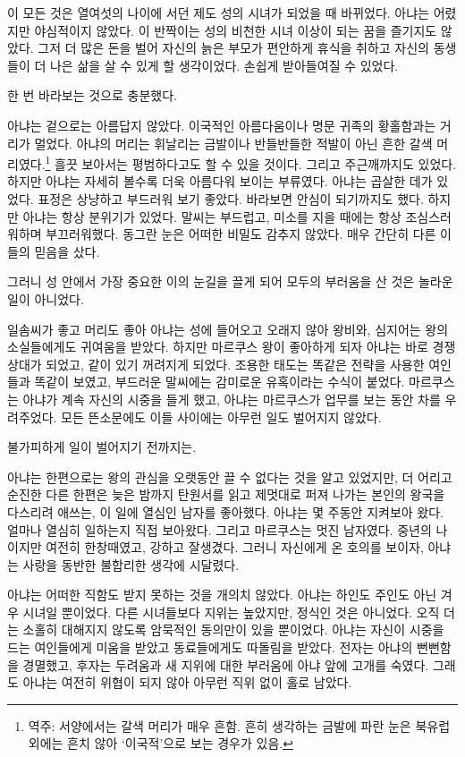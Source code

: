 이 모든 것은 열여섯의 나이에 서던 제도 성의 시녀가 되었을 때 바뀌었다. 아냐는 어렸지만 야심적이지 않았다. 이 반짝이는 성의 비천한 시녀 이상이 되는 꿈을 즐기지도 않았다. 그저 더 많은 돈을 벌어 자신의 늙은 부모가 편안하게 휴식을 취하고 자신의 동생들이 더 나은 삶을 살 수 있게 할 생각이었다. 손쉽게 받아들여질 수 있었다.

한 번 바라보는 것으로 충분했다.

아냐는 겉으로는 아름답지 않았다. 이국적인 아름다움이나 명문 귀족의 황홀함과는 거리가 멀었다. 아냐의 머리는 휘날리는 금발이나 반들반들한 적발이 아닌 흔한 갈색 머리였다.\footnote{역주: 서양에서는 갈색 머리가 매우 흔함. 흔히 생각하는 금발에 파란 눈은 북유럽 외에는 흔치 않아 `이국적'으로 보는 경우가 있음.} 흘끗 보아서는 평범하다고도 할 수 있을 것이다. 그리고 주근깨까지도 있었다. 하지만 아냐는 자세히 볼수록 더욱 아름다워 보이는 부류였다. 아냐는 곱살한 데가 있었다. 표정은 상냥하고 부드러워 보기 좋았다. 바라보면 안심이 되기까지도 했다. 하지만 아냐는 항상 분위기가 있었다. 말씨는 부드럽고, 미소를 지을 때에는 항상 조심스러워하며 부끄러워했다. 동그란 눈은 어떠한 비밀도 감추지 않았다. 매우 간단히 다른 이들의 믿음을 샀다.

그러니 성 안에서 가장 중요한 이의 눈길을 끌게 되어 모두의 부러움을 산 것은 놀라운 일이 아니었다.

일솜씨가 좋고 머리도 좋아 아냐는 성에 들어오고 오래지 않아 왕비와, 심지어는 왕의 소실들에게도 귀여움을 받았다. 하지만 마르쿠스 왕이 좋아하게 되자 아냐는 바로 경쟁 상대가 되었고, 같이 있기 꺼려지게 되었다. 조용한 태도는 똑같은 전략을 사용한 여인들과 똑같이 보였고, 부드러운 말씨에는 감미로운 유혹이라는 수식이 붙었다. 마르쿠스는 아냐가 계속 자신의 시중을 들게 했고, 아냐는 마르쿠스가 업무를 보는 동안 차를 우려주었다. 모든 뜬소문에도 이들 사이에는 아무런 일도 벌어지지 않았다.

불가피하게 일이 벌어지기 전까지는.

아냐는 한편으로는 왕의 관심을 오랫동안 끌 수 없다는 것을 알고 있었지만, 더 어리고 순진한 다른 한편은 늦은 밤까지 탄원서를 읽고 제멋대로 퍼져 나가는 본인의 왕국을 다스리려 애쓰는, 이 일에 열심인 남자를 좋아했다. 아냐는 몇 주동안 지켜보아 왔다. 얼마나 열심히 일하는지 직접 보아왔다. 그리고 마르쿠스는 멋진 남자였다. 중년의 나이지만 여전히 한창때였고, 강하고 잘생겼다. 그러니 자신에게 온 호의를 보이자, 아냐는 사랑을 동반한 불합리한 생각에 시달렸다.

아냐는 어떠한 직함도 받지 못하는 것을 개의치 않았다. 아냐는 하인도 주인도 아닌 겨우 시녀일 뿐이었다. 다른 시녀들보다 지위는 높았지만, 정식인 것은 아니었다. 오직 더는 소홀히 대해지지 않도록 암묵적인 동의만이 있을 뿐이었다. 아냐는 자신이 시중을 드는 여인들에게 미움을 받았고 동료들에게도 따돌림을 받았다. 전자는 아냐의 뻔뻔함을 경멸했고, 후자는 두려움과 새 지위에 대한 부러움에 아냐 앞에 고개를 숙였다. 그래도 아냐는 여전히 위협이 되지 않아 아무런 직위 없이 홀로 남았다.

